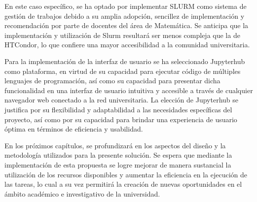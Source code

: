 \begin{spacing}{1.5}
En este caso específico, se ha optado por implementar SLURM como sistema de gestión de trabajos debido a su amplia adopción, sencillez de implementación y recomendación por parte de docentes del área de Matemática. Se anticipa que la implementación y utilización de Slurm resultará ser menos compleja que la de HTCondor, lo que confiere una mayor accesibilidad a la comunidad universitaria.

Para la implementación de la interfaz de usuario se ha seleccionado Jupyterhub como plataforma, en virtud de su capacidad para ejecutar código de múltiples lenguajes de programación, así como su capacidad para presentar dicha funcionalidad en una interfaz de usuario intuitiva y accesible a través de cualquier navegador web conectado a la red universitaria. La elección de Jupyterhub se justifica por su flexibilidad y adaptabilidad a las necesidades específicas del proyecto, así como por su capacidad para brindar una experiencia de usuario óptima en términos de eficiencia y usabilidad.

En los próximos capítulos, se profundizará en los aspectos del diseño y la metodología utilizados para la presente solución. Se espera que mediante la implementación de esta propuesta se logre mejorar de manera sustancial la utilización de los recursos disponibles y aumentar la eficiencia en la ejecución de las tareas, lo cual a su vez permitirá la creación de nuevas oportunidades en el ámbito académico e investigativo de la universidad.

  \mylinespacing
  \mylinespacing
  \begin{tightcenter}
  \end{tightcenter}
\end{spacing}